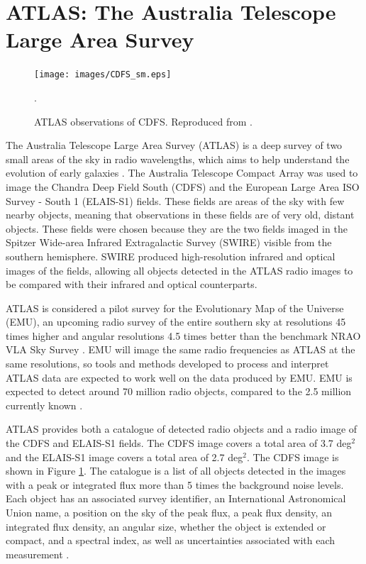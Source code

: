     \section{ATLAS: The Australia Telescope Large Area Survey}

        \begin{figure}[!ht]
          \texttt{[image: images/CDFS\_sm.eps]}
          \caption{ATLAS observations of CDFS. Reproduced from \citet{franzen15}.}.
          \label{fig:cdfs}
        \end{figure}

        The Australia Telescope Large Area Survey (ATLAS) is a deep  survey of two small areas of the sky in radio wavelengths, which aims to help understand the evolution of early galaxies \citep{norris06}. The Australia Telescope Compact Array was used to image the Chandra Deep Field South (CDFS) and the European Large Area ISO Survey - South 1 (ELAIS-S1) fields. These fields are areas of the sky with few nearby objects, meaning that observations in these fields are of very old, distant objects. These fields were chosen because they are the two fields imaged in the Spitzer Wide-area Infrared Extragalactic Survey (SWIRE) visible from the southern hemisphere. SWIRE produced high-resolution infrared and optical images of the fields, allowing all objects detected in the ATLAS radio images to be compared with their infrared and optical counterparts.

        ATLAS is considered a pilot survey for the Evolutionary Map of the Universe (EMU), an upcoming radio survey of the entire southern sky at resolutions 45 times higher and angular resolutions 4.5 times better than the benchmark NRAO VLA Sky Survey \citep{norris11b}. EMU will image the same radio frequencies as ATLAS at the same resolutions, so tools and methods developed to process and interpret ATLAS data are expected to work well on the data produced by EMU. EMU is expected to detect around 70 million radio objects, compared to the 2.5 million currently known \citep{banfield15}.

        ATLAS provides both a catalogue of detected radio objects and a radio image of the CDFS and ELAIS-S1 fields. The CDFS image covers a total area of 3.7 deg$^2$ and the ELAIS-S1 image covers a total area of 2.7 deg$^2$. The CDFS image is shown in Figure \ref{fig:cdfs}. The catalogue is a list of all objects detected in the images with a peak or integrated flux more than 5 times the background noise levels. Each object has an associated survey identifier, an International Astronomical Union name, a position on the sky of the peak flux, a peak flux density, an integrated flux density, an angular size, whether the object is extended or compact, and a spectral index, as well as uncertainties associated with each measurement \citep{franzen15}.

